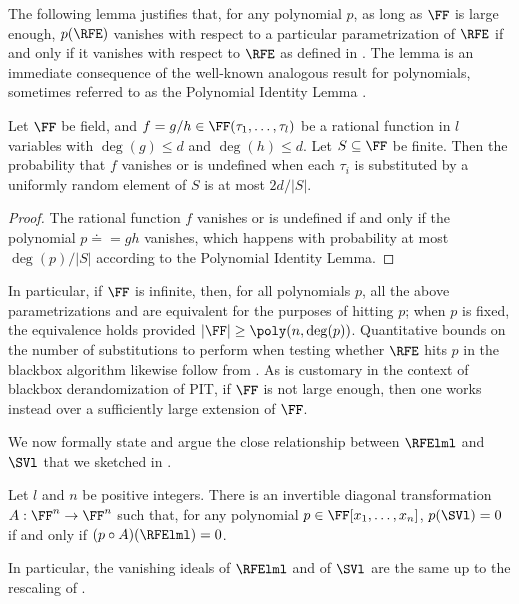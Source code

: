 The following lemma justifies that,
for any polynomial \(p\),
as long as \(\FF\) is large enough,
\(p(\RFE)\) vanishes with respect to a particular parametrization of \(\RFE\)
if and only if
it vanishes with respect to \(\RFE\) as defined in .
The lemma is an %
%
%
immediate consequence %
of the well-known analogous result for polynomials, sometimes referred to as the
%
Polynomial Identity Lemma   %
\cite{Ore1922,DeMilloLipton1978,Zippel1979,Schwartz1980,arvind19}.
%
%
%

\begin{lemma}
  \label{lem.schwz}
  Let \(\FF\) be field,
  and \(f = g/h\in\FF(\tau_1,\ldots,\tau_l)\) be a rational function in \(l\)
  variables with \(\deg(g) \le d\) and \(\deg(h)\le d\).
  Let \(S\subseteq\FF\) be finite.
  Then the probability that \(f\) vanishes or is undefined when each
  \(\tau_i\) is substituted by a uniformly random element of \(S\)
  is at most \(2d/|S|\).
\end{lemma}
%
\begin{proof}
The rational function $f$ vanishes or is undefined if and only if the polynomial $p \doteq =gh$ vanishes, which happens with probability at most $\deg(p)/|S|$
according to the Polynomial Identity Lemma.
\end{proof}
%
%

In particular,
if \(\FF\) is infinite,
then, for all polynomials \(p\),
all the above parametrizations and 
are equivalent for the purposes of hitting \(p\);
when \(p\) is fixed,
the equivalence holds provided \(|\FF| \ge \poly(n, \deg(p))\).
Quantitative bounds on the number of substitutions to perform
when testing whether \(\RFE\) hits \(p\) in the blackbox algorithm
likewise follow from .
As is customary in the context of blackbox derandomization of PIT,
if $\FF$ is not large enough,
then one works instead over a sufficiently large extension of $\FF$.

\medskip

We now formally state and argue the close relationship between $\RFElml$ and $\SVl$ that we sketched in .
\begin{proposition}
  \label{prop.rfe-equiv-sv}
  Let $l$ and $n$ be positive integers.
  There is an invertible diagonal transformation \(A : \FF^n\to\FF^n\)
  such that, for any polynomial \(p\in\FF[x_1,\ldots,x_n]\),
  \(p(\SVl) = 0\) if and only if \((p\circ A)(\RFElml) = 0\).
\end{proposition}
In particular, the vanishing ideals of $\RFElml$ and of $\SVl$ are the
same up to the rescaling of .

